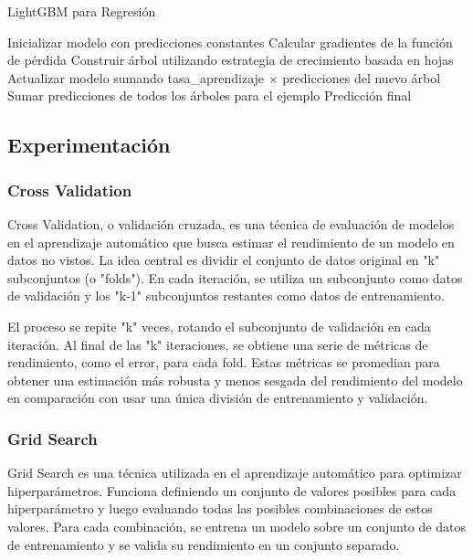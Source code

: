 \documentclass[12pt]{article}
\begin{document}
\begin{algorithm}
\caption{LightGBM para Regresión}
\begin{algorithmic}[1]
    \State Inicializar modelo con predicciones constantes
        \State Calcular gradientes de la función de pérdida
        \State Construir árbol utilizando estrategia de crecimiento basada en hojas
        \State Actualizar modelo sumando tasa\_aprendizaje $\times$ predicciones del nuevo árbol
    \EndFor
        \State Sumar predicciones de todos los árboles para el ejemplo
        \State \Return Predicción final
    \EndProcedure
\EndProcedure
\end{algorithmic}
\end{algorithm}
 
\subsection{Experimentación}



\subsubsection{Cross Validation}

Cross Validation, o validación cruzada, es una técnica de evaluación de modelos en el aprendizaje automático que busca estimar el rendimiento de un modelo en datos no vistos. La idea central es dividir el conjunto de datos original en "k" subconjuntos (o "folds"). En cada iteración, se utiliza un subconjunto como datos de validación y los "k-1" subconjuntos restantes como datos de entrenamiento.

El proceso se repite "k" veces, rotando el subconjunto de validación en cada iteración. Al final de las "k" iteraciones, se obtiene una serie de métricas de rendimiento, como el error, para cada fold. Estas métricas se promedian para obtener una estimación más robusta y menos sesgada del rendimiento del modelo en comparación con usar una única división de entrenamiento y validación.


\subsubsection{Grid Search}

Grid Search es una técnica utilizada en el aprendizaje automático para optimizar hiperparámetros. Funciona definiendo un conjunto de valores posibles para cada hiperparámetro y luego evaluando todas las posibles combinaciones de estos valores. Para cada combinación, se entrena un modelo sobre un conjunto de datos de entrenamiento y se valida su rendimiento en un conjunto separado.
\end{document}

